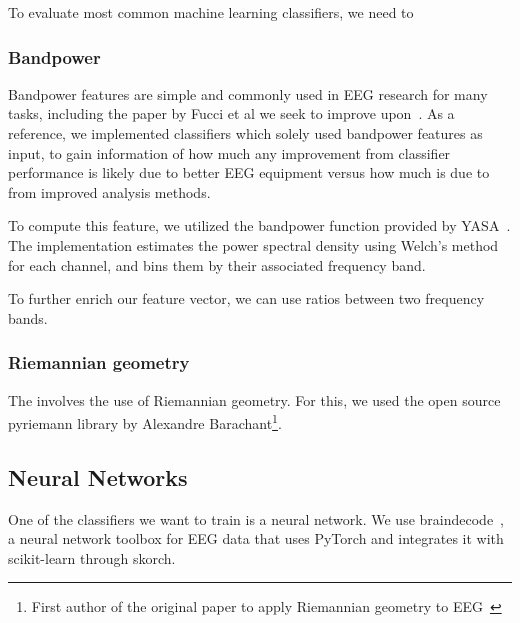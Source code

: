         To evaluate most common machine learning classifiers, we need to

        \subsubsection{Bandpower}


            Bandpower features are simple and commonly used in EEG research for many tasks, including the paper by Fucci et al we seek to improve upon~\cite{fucci_replication_2019}. As a reference, we implemented classifiers which solely used bandpower features as input, to gain information of how much any improvement from classifier performance is likely due to better EEG equipment versus how much is due to from improved analysis methods.

            To compute this feature, we utilized the bandpower function provided by YASA~\cite{vallat_yasa_2020}. The implementation estimates the power spectral density using Welch's method for each channel, and bins them by their associated frequency band.

            To further enrich our feature vector, we can use ratios between two frequency bands.

        \subsubsection{Riemannian geometry}


            The  involves the use of Riemannian geometry. For this, we used the open source pyriemann library by Alexandre Barachant\footnote{First author of the original paper to apply Riemannian geometry to EEG~\cite{barachant_classification_2013}}.

    \subsection{Neural Networks}

        One of the classifiers we want to train is a neural network. We use braindecode~\cite{schirrmeister_deep_2017}\cite{noauthor_braindecode_2021}, a neural network toolbox for EEG data that uses PyTorch and integrates it with scikit-learn through skorch.

